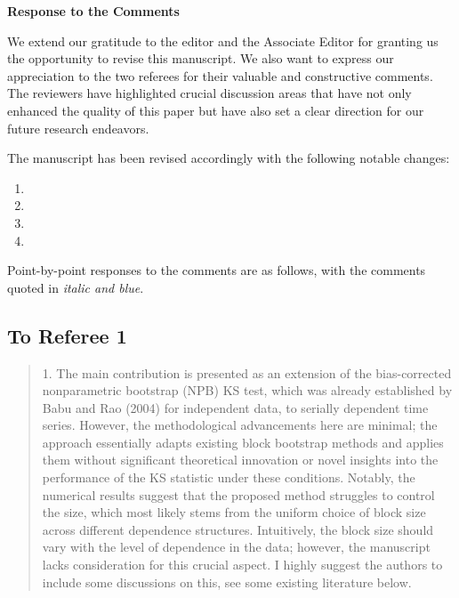 \documentclass[12pt]{article}
\newenvironment{comment}%
{\begin{quotation}\noindent\small\it\color{darkblue}\ignorespaces%
}{\end{quotation}}
\begin{document}
\begin{center}
  {\Large\bf Response to the Comments}
\end{center}

We extend our gratitude to the editor and the Associate Editor for
granting us the opportunity to revise this manuscript. We also want to
express our appreciation to the two referees for their valuable and
constructive comments. The reviewers have highlighted crucial
discussion areas that have not only enhanced the quality of this paper
but have also set a clear direction for our future research
endeavors.


The manuscript has been
revised accordingly with the following notable changes:
\begin{enumerate}
\item 
\item 
\item 
\item 
\end{enumerate}


Point-by-point responses to the comments are as follows, with the
comments quoted in \emph{\color{darkblue} italic and blue}.

\subsection*{To Referee 1}

\begin{comment}
1. The main contribution is presented as an extension of the bias-corrected 
nonparametric
bootstrap (NPB) KS test, which was already established by Babu and Rao (2004) 
for independent data, to serially dependent time series. However, the 
methodological advancements
here are minimal; the approach essentially adapts existing block bootstrap 
methods and applies them without significant theoretical innovation or novel 
insights into the performance
of the KS statistic under these conditions. Notably, the numerical results 
suggest that the
proposed method struggles to control the size, which most likely stems from the 
uniform
choice of block size across different dependence structures. Intuitively, the 
block size should
vary with the level of dependence in the data; however, the manuscript lacks 
consideration
for this crucial aspect. I highly suggest the authors to include some 
discussions on this, see
some existing literature below.

\citep{hall1995blocking}

\citep{lahiri1999theoretical}

\citep{buhlmann2002bootstraps}

\citep{politis2004automatic}

\citep{lahiri2013resampling}

\end{comment}
\end{document}
